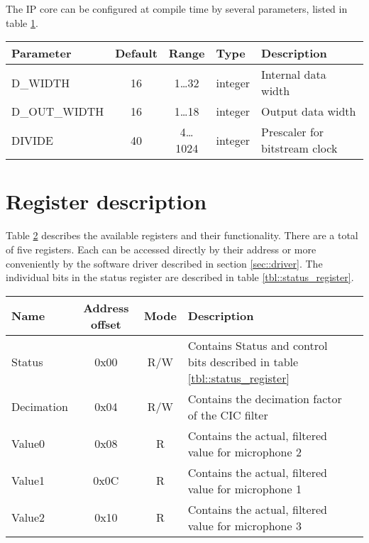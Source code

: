 The IP core can be configured at compile time by several parameters, listed in table \ref{tbl::parameters}.
\begin{table}[h]
	\centering
	\label{tbl::parameters}
	\begin{tabular}{|l|c|c|l|l|}
		\hline 
		Parameter & Default & Range & Type & Description \\ 
		\hline 
		D\_WIDTH & 16 & 1\ldots32 & integer & Internal data width \\
		\hline 
		D\_OUT\_WIDTH & 16 & 1\ldots18 & integer & Output data width \\
		\hline 
		DIVIDE & 40 & 4\ldots1024 & integer & Prescaler for bitstream clock \\
		\hline 
	\end{tabular} 
\end{table}

\newpage

\section{Register description}
\label{sec::registers}
Table \ref{tbl::register_space} describes the available registers and their functionality.
There are a total of five registers.
Each can be accessed directly by their address or more conveniently by the software driver described in section \ref{sec::driver}.
The individual bits in the status register are described in table  \ref{tbl::status_register}.

\begin{table}[h]
	\centering
	\label{tbl::register_space}
	\begin{tabular}{|l|c|c|l|l|}
		\hline 
		Name & Address offset & Mode & Description \\
		\hline 
		Status & 0x00 & R/W & Contains Status and control bits described in table \ref{tbl::status_register} \\
		\hline 
		Decimation & 0x04 & R/W & Contains the decimation factor of the CIC filter \\
		\hline 
		Value0 & 0x08 & R & Contains the actual, filtered value for microphone 2 \\
		\hline 
		Value1 & 0x0C & R & Contains the actual, filtered value for microphone 1 \\
		\hline 
		Value2 & 0x10 & R & Contains the actual, filtered value for microphone 3 \\
		\hline 
	\end{tabular} 
\end{table}

